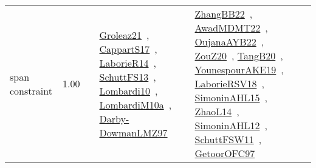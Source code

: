 {\begin{longtable}{p{3cm}r>{\raggedright\arraybackslash}p{6cm}>{\raggedright\arraybackslash}p{6cm}>{\raggedright\arraybackslash}p{8cm}}
\index{span constraint}\index{Constraints!span constraint}span constraint &  1.00 &  & \href{../works/Groleaz21.pdf}{Groleaz21}~\cite{Groleaz21}, \href{../works/CappartS17.pdf}{CappartS17}~\cite{CappartS17}, \href{../works/LaborieR14.pdf}{LaborieR14}~\cite{LaborieR14}, \href{../works/SchuttFS13.pdf}{SchuttFS13}~\cite{SchuttFS13}, \href{../works/Lombardi10.pdf}{Lombardi10}~\cite{Lombardi10}, \href{../works/LombardiM10a.pdf}{LombardiM10a}~\cite{LombardiM10a}, \href{../works/Darby-DowmanLMZ97.pdf}{Darby-DowmanLMZ97}~\cite{Darby-DowmanLMZ97} & \href{../works/ZhangBB22.pdf}{ZhangBB22}~\cite{ZhangBB22}, \href{../works/AwadMDMT22.pdf}{AwadMDMT22}~\cite{AwadMDMT22}, \href{../works/OujanaAYB22.pdf}{OujanaAYB22}~\cite{OujanaAYB22}, \href{../works/ZouZ20.pdf}{ZouZ20}~\cite{ZouZ20}, \href{../works/TangB20.pdf}{TangB20}~\cite{TangB20}, \href{../works/YounespourAKE19.pdf}{YounespourAKE19}~\cite{YounespourAKE19}, \href{../works/LaborieRSV18.pdf}{LaborieRSV18}~\cite{LaborieRSV18}, \href{../works/SimoninAHL15.pdf}{SimoninAHL15}~\cite{SimoninAHL15}, \href{../works/ZhaoL14.pdf}{ZhaoL14}~\cite{ZhaoL14}, \href{../works/SimoninAHL12.pdf}{SimoninAHL12}~\cite{SimoninAHL12}, \href{../works/SchuttFSW11.pdf}{SchuttFSW11}~\cite{SchuttFSW11}, \href{../works/GetoorOFC97.pdf}{GetoorOFC97}~\cite{GetoorOFC97}\\

\end{longtable}}
